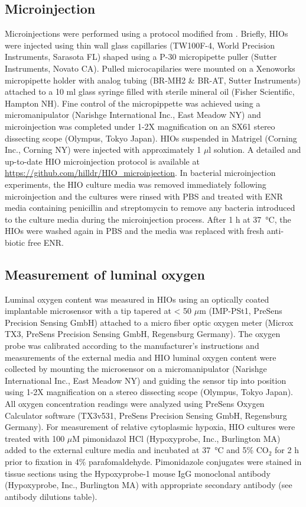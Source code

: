 \documentclass[9pt,lineo]{elife}
\begin{document}
\subsection*{{\bfseries\sffamily } Microinjection}
\label{sec:orgheadline17}
Microinjections were performed using a protocol modified from \citet{Leslie:2015}. Briefly, HIOs were injected using thin wall glass capillaries (TW100F-4, World Precision Instruments, Sarasota FL) shaped using a P-30 micropipette puller (Sutter Instruments, Novato CA). Pulled microcapilaries were mounted on a Xenoworks micropipette holder with analog tubing (BR-MH2 \& BR-AT, Sutter Instruments) attached to a 10 ml glass syringe filled with sterile mineral oil (Fisher Scientific, Hampton NH). Fine control of the micropippette was achieved using a micromanipulator (Narishge International Inc., East Meadow NY) and microinjection was completed under 1-2X magnification on an SX61 stereo dissecting scope (Olympus, Tokyo Japan). HIOs suspended in Matrigel (Corning Inc., Corning NY) were injected with approximately 1 \(\mu\)l solution. A detailed and up-to-date HIO microinjection protocol is available at \url{https://github.com/hilldr/HIO_microinjection}. In bacterial microinjection experiments, the HIO culture media was removed immediately following microinjection and the cultures were rinsed with PBS and treated with ENR media containing penicillin and streptomycin to remove any bacteria introduced to the culture media during the microinjection process. After 1 h at \SI{37}{\celsius}, the HIOs were washed again in PBS and the media was replaced with fresh anti-biotic free ENR. 
\subsection*{{\bfseries\sffamily } Measurement of luminal oxygen}
\label{sec:orgheadline18}
Luminal oxygen content was measured in HIOs using an optically coated implantable microsensor with a tip tapered at < 50 \(\mu\)m (IMP-PSt1, PreSens Precision Sensing GmbH) attached to a micro fiber optic oxygen meter (Microx TX3, PreSens Precision Sensing GmbH, Regensburg Germany). The oxygen probe was calibrated according to the manufacturer's instructions and measurements of the external media and HIO luminal oxygen content were collected by mounting the microsensor on a micromanipulator (Narishge International Inc., East Meadow NY) and guiding the sensor tip into position using 1-2X magnification on a stereo dissecting scope (Olympus, Tokyo Japan). All oxygen concentration readings were analyzed using PreSens Oxygen Calculator software (TX3v531, PreSens Precision Sensing GmbH, Regensburg Germany). 
For measurement of relative cytoplasmic hypoxia, HIO cultures were treated with 100 \(\mu\)M pimonidazol HCl (Hypoxyprobe, Inc., Burlington MA) added to the external culture media and incubated at \SI{37}{\celsius} and 5\% CO\(_{\text{2}}\) for 2 h prior to fixation in 4\% parafomaldehyde. Pimonidazole conjugates were stained in tissue sections using the Hypoxyprobe-1 mouse IgG monoclonal antibody (Hypoxyprobe, Inc., Burlington MA) with appropriate secondary antibody (see antibody dilutions table).
\end{document}
